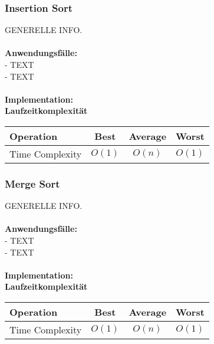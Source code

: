\documentclass[../main.tex]{subfiles}
\begin{document}
	\subsubsection{Insertion Sort}
	GENERELLE INFO. \\\\
	\textbf{Anwendungsfälle:}\\
	- TEXT\\
	- TEXT\\\\
	\textbf{Implementation:}\\
	 
	\textbf{Laufzeitkomplexität}\\
	\begin{table}[ht]
		\centering
		\begin{tabular}{l *{3}{c}}
			\toprule
			Operation & Best & Average & Worst\\
			\midrule
			Time Complexity & $O(1)$ & $O(n)$ & $O(1)$\\
			\bottomrule
		\end{tabular}
	\end{table}
	\clearpage
	
	\subsubsection{Merge Sort}
	GENERELLE INFO. \\\\
	\textbf{Anwendungsfälle:}\\
	- TEXT\\
	- TEXT\\\\
	\textbf{Implementation:}\\
	 
	\textbf{Laufzeitkomplexität}\\
	\begin{table}[ht]
		\centering
		\begin{tabular}{l *{3}{c}}
			\toprule
			Operation & Best & Average & Worst\\
			\midrule
			Time Complexity & $O(1)$ & $O(n)$ & $O(1)$\\
			\bottomrule
		\end{tabular}
	\end{table}
	\clearpage
	
\end{document}
